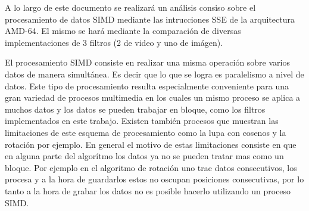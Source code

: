 

	A lo largo de este documento se realizará un análisis consiso sobre el
procesamiento de datos SIMD mediante las intrucciones SSE de la arquitectura
AMD-64. El mismo se hará mediante la comparación de diversas implementaciones
de 3 filtros (2 de video y uno de imágen).

	El procesamiento SIMD consiste en realizar una misma operación sobre varios
datos de manera simultánea. Es decir que lo que se logra es paralelismo a nivel
de datos. Este tipo de procesamiento resulta especialmente conveniente para una
gran variedad de procesos multimedia en los cuales un mismo proceso se aplica
a muchos datos y los datos se pueden trabajar en bloque, como los filtros
implementados en este trabajo. Existen también procesos que muestran las
limitaciones de este esquema de procesamiento como la lupa con cosenos y
la rotación por ejemplo. En general el motivo de estas limitaciones
consiste en que en alguna parte del algorítmo los datos ya no se pueden
tratar mas como un bloque. Por ejemplo en el algoritmo de rotación
uno trae datos consecutivos, los procesa y a la hora de guardarlos
estos no oscupan posiciones consecutivas, por lo tanto a la hora
de grabar los datos no es posible hacerlo utilizando un proceso SIMD.

